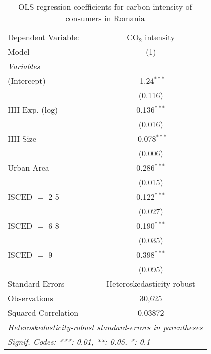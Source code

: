 
\begin{table}[htbp!]
   \centering
   \small
   \begin{adjustbox}{width = 1\textwidth, max height = 0.95\textheight, center}
      \begin{threeparttable}[b]
         \caption{\label{tab:OLS_1_ROU} OLS-regression coefficients for carbon intensity of consumers in Romania}
         \begin{tabular}{lc}
            \tabularnewline \midrule \midrule
            Dependent Variable: & CO$_{2}$ intensity\\  
            Model               & (1)\\  
            \midrule
            \emph{Variables}\\
            (Intercept)         & -1.24$^{***}$\\   
                                & (0.116)\\   
            HH Exp. (log)       & 0.136$^{***}$\\   
                                & (0.016)\\   
            HH Size             & -0.078$^{***}$\\   
                                & (0.006)\\   
            Urban Area          & 0.286$^{***}$\\   
                                & (0.015)\\   
            ISCED $=$ 2-5       & 0.122$^{***}$\\   
                                & (0.027)\\   
            ISCED $=$ 6-8       & 0.190$^{***}$\\   
                                & (0.035)\\   
            ISCED $=$ 9         & 0.398$^{***}$\\   
                                & (0.095)\\   
            \midrule 
            Standard-Errors     & Heteroskedasticity-robust \\   
            Observations        & 30,625\\  
            Squared Correlation & 0.03872\\  
            \midrule \midrule
            \multicolumn{2}{l}{\emph{Heteroskedasticity-robust standard-errors in parentheses}}\\
            \multicolumn{2}{l}{\emph{Signif. Codes: ***: 0.01, **: 0.05, *: 0.1}}\\
         \end{tabular}
         

\end{threeparttable}
\end{adjustbox}
\end{table}
